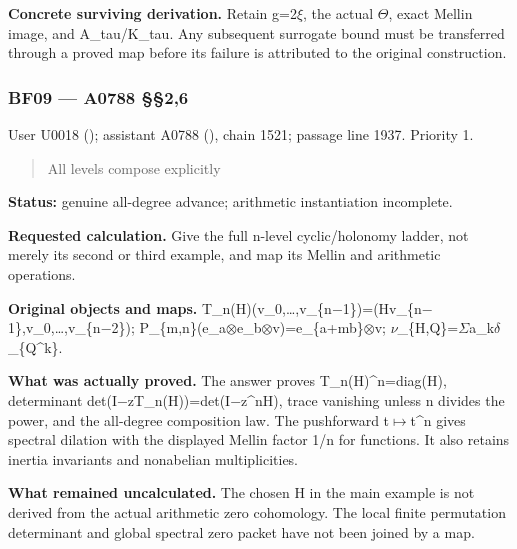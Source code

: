 \textbf{Concrete surviving derivation.} Retain
g=2\allowbreak{}\ensuremath{ξ}\allowbreak{}, the actual
\allowbreak{}\ensuremath{Θ}\allowbreak{}, exact Mellin image, and
A\_tau/K\_tau. Any subsequent surrogate bound must be transferred
through a proved map before its failure is attributed to the original
construction.

\subsubsection{BF09 --- A0788 §§2,6}\label{TranscriptLedgerStage:bf09-a0788-26}

User U0018 (\protect{});
assistant A0788 (\protect{}),
chain 1521; passage line 1937. Priority 1.

\begin{quote}
All levels compose explicitly
\end{quote}

\textbf{Status:} genuine all-degree advance; arithmetic instantiation
incomplete.

\textbf{Requested calculation.} Give the full n-level cyclic/holonomy
ladder, not merely its second or third example, and map its Mellin and
arithmetic operations.

\textbf{Original objects and maps.}
T\_n(H)(v\_0,…,v\_\{n\allowbreak{}\ensuremath{−}\allowbreak{}1\})=(Hv\_\{n\allowbreak{}\ensuremath{−}\allowbreak{}1\},v\_0,…,v\_\{n\allowbreak{}\ensuremath{−}\allowbreak{}2\});
P\_\{m,n\}(e\_a\allowbreak{}\ensuremath{⊗}\allowbreak{}e\_b\allowbreak{}\ensuremath{⊗}\allowbreak{}v)=e\_\{a+mb\}\allowbreak{}\ensuremath{⊗}\allowbreak{}v;
\allowbreak{}\ensuremath{ν}\allowbreak{}\_\{H,Q\}=\allowbreak{}\ensuremath{Σ}\allowbreak{}a\_k\allowbreak{}\ensuremath{δ}\allowbreak{}\_\{Q\textasciicircum{}k\}.

\textbf{What was actually proved.} The answer proves
T\_n(H)\^{}n=diag(H), determinant
det(I\allowbreak{}\ensuremath{−}\allowbreak{}zT\_n(H))=det(I\allowbreak{}\ensuremath{−}\allowbreak{}z\textasciicircum{}nH),
trace vanishing unless n divides the power, and the all-degree
composition law. The pushforward
t\allowbreak{}\ensuremath{↦}\allowbreak{}t\textasciicircum{}n gives
spectral dilation with the displayed Mellin factor 1/n for functions. It
also retains inertia invariants and nonabelian multiplicities.

\textbf{What remained uncalculated.} The chosen H in the main example is
not derived from the actual arithmetic zero cohomology. The local finite
permutation determinant and global spectral zero packet have not been
joined by a map.

